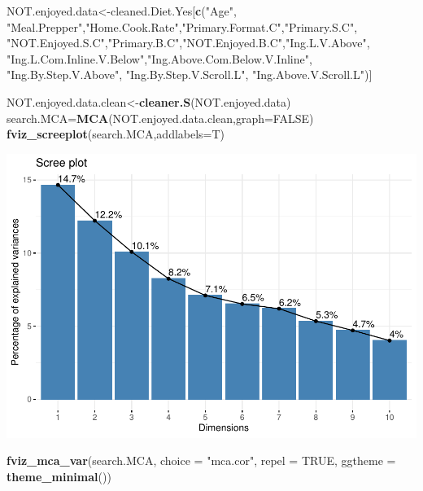 \documentclass[
]{article}
\newenvironment{Shaded}{\begin{snugshade}}{\end{snugshade}}
\newcommand{\DataTypeTok}[1]{\textcolor[rgb]{0.13,0.29,0.53}{#1}}
\newcommand{\KeywordTok}[1]{\textcolor[rgb]{0.13,0.29,0.53}{\textbf{#1}}}
\newcommand{\NormalTok}[1]{#1}
\newcommand{\OtherTok}[1]{\textcolor[rgb]{0.56,0.35,0.01}{#1}}
\newcommand{\StringTok}[1]{\textcolor[rgb]{0.31,0.60,0.02}{#1}}
\begin{document}
\begin{Shaded}
\begin{Highlighting}[]
\NormalTok{NOT.enjoyed.data<-cleaned.Diet.Yes[}\KeywordTok{c}\NormalTok{(}\StringTok{"Age"}\NormalTok{, }\StringTok{"Meal.Prepper"}\NormalTok{,}\StringTok{"Home.Cook.Rate"}\NormalTok{,}\StringTok{"Primary.Format.C"}\NormalTok{,}\StringTok{"Primary.S.C"}\NormalTok{,}
            \StringTok{"NOT.Enjoyed.S.C"}\NormalTok{,}\StringTok{"Primary.B.C"}\NormalTok{,}\StringTok{"NOT.Enjoyed.B.C"}\NormalTok{,}\StringTok{"Ing.L.V.Above"}\NormalTok{,}
            \StringTok{"Ing.L.Com.Inline.V.Below"}\NormalTok{,}\StringTok{"Ing.Above.Com.Below.V.Inline"}\NormalTok{,  }\StringTok{"Ing.By.Step.V.Above"}\NormalTok{,  }\StringTok{"Ing.By.Step.V.Scroll.L"}\NormalTok{,}
            \StringTok{"Ing.Above.V.Scroll.L"}\NormalTok{)]}

\NormalTok{NOT.enjoyed.data.clean<-}\KeywordTok{cleaner.S}\NormalTok{(NOT.enjoyed.data)}
\NormalTok{search.MCA=}\KeywordTok{MCA}\NormalTok{(NOT.enjoyed.data.clean,}\DataTypeTok{graph=}\OtherTok{FALSE}\NormalTok{)}
\KeywordTok{fviz_screeplot}\NormalTok{(search.MCA,}\DataTypeTok{addlabels=}\NormalTok{T)}
\end{Highlighting}
\end{Shaded}

\includegraphics{Average-User-MCA_files/figure-latex/diet yes not enjoy-1.pdf}

\begin{Shaded}
\begin{Highlighting}[]
\KeywordTok{fviz_mca_var}\NormalTok{(search.MCA, }\DataTypeTok{choice =} \StringTok{"mca.cor"}\NormalTok{, }\DataTypeTok{repel =} \OtherTok{TRUE}\NormalTok{,}
             \DataTypeTok{ggtheme =} \KeywordTok{theme_minimal}\NormalTok{())}
\end{Highlighting}
\end{Shaded}
\end{document}
